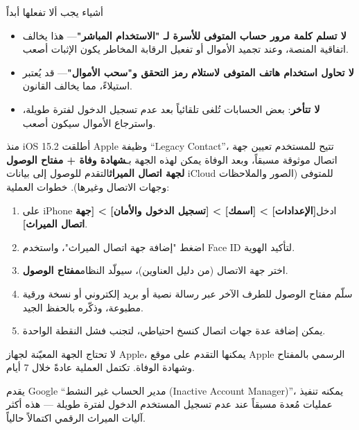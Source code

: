\begin{tcbwarn}{أشياء يجب ألا تفعلها أبداً}
\begin{itemize}
  \item \textbf{لا تسلم كلمة مرور حساب المتوفى للأسرة لـ "الاستخدام المباشر"}— هذا يخالف اتفاقية المنصة، وعند تجميد الأموال أو تفعيل الرقابة المخاطر يكون الإثبات أصعب.
  \item \textbf{لا تحاول استخدام هاتف المتوفى لاستلام رمز التحقق و"سحب الأموال"}— قد يُعتبر استيلاءً، مما يخالف القانون.
  \item \textbf{لا تتأخر}: بعض الحسابات تُلغى تلقائياً بعد عدم تسجيل الدخول لفترة طويلة، واسترجاع الأموال سيكون أصعب.
\end{itemize}

\end{tcbwarn}


منذ iOS 15.2 أطلقت Apple وظيفة “Legacy Contact”، تتيح للمستخدم تعيين جهة اتصال موثوقة مسبقاً، وبعد الوفاة يمكن لهذه الجهة بـ\textbf{شهادة وفاة + مفتاح الوصول لجهة اتصال الميراث}التقدم للوصول إلى بيانات iCloud للمتوفى (الصور والملاحظات وجهات الاتصال وغيرها). خطوات العملية:

\begin{enumerate}
  \item على iPhone ادخل\textbf{[الإعدادات] > [اسمك] > [تسجيل الدخول والأمان] > [جهة اتصال الميراث]}.
  \item اضغط "إضافة جهة اتصال الميراث"، واستخدم Face ID لتأكيد الهوية.
  \item اختر جهة الاتصال (من دليل العناوين)، سيولّد النظام\textbf{مفتاح الوصول}.
  \item سلّم مفتاح الوصول للطرف الآخر عبر رسالة نصية أو بريد إلكتروني أو نسخة ورقية مطبوعة، وذكّره بالحفظ الجيد.
  \item يمكن إضافة عدة جهات اتصال كنسخ احتياطي، لتجنب فشل النقطة الواحدة.
\end{enumerate}

لا تحتاج الجهة المعيّنة لجهاز Apple، يمكنها التقدم على موقع Apple الرسمي بالمفتاح وشهادة الوفاة. تكتمل العملية عادةً خلال 7 أيام.


يقدم Google “مدير الحساب غير النشط (Inactive Account Manager)”، يمكنه تنفيذ عمليات مُعدة مسبقاً عند عدم تسجيل المستخدم الدخول لفترة طويلة — هذه أكثر آليات الميراث الرقمي اكتمالاً حالياً.

